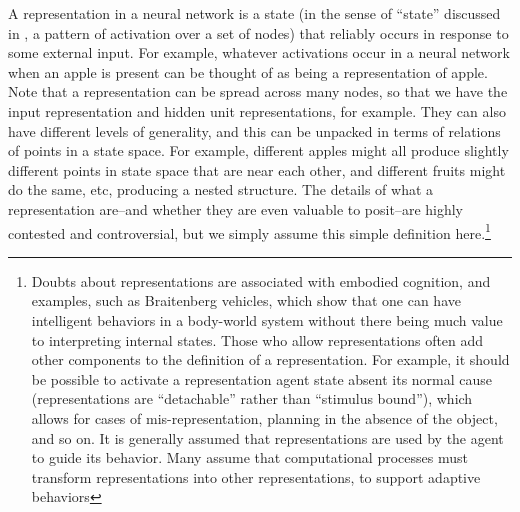 
A representation in a neural network is a state (in the sense of ``state'' discussed in ,  a pattern of activation over a set of nodes) that reliably occurs in response to some external input. For example, whatever activations occur in a neural network when an apple is present can be thought of as being a representation of apple. Note that a representation can be spread across many nodes, so that we have the input representation and hidden unit representations, for example. They can also have different levels of generality, and this can be unpacked in terms of relations of points in a state space. For example, different apples might all produce slightly different points in state space that are near each other, and different fruits might do the same, etc, producing a nested structure. The details of what a representation are--and whether they are even valuable to posit--are highly contested and controversial, but we simply assume this simple definition here.\footnote{Doubts about representations are associated with embodied cognition, and examples, such as Braitenberg vehicles, which show that one can have intelligent behaviors in a body-world system without there being much value to interpreting internal states. Those who allow representations  often add other components to the definition of a representation. For example, it should be  possible to activate a representation agent state absent its normal cause (representations  are ``detachable'' rather than ``stimulus bound''), which allows for cases of  mis-representation, planning in the absence of the object, and so on. It is generally assumed that  representations are used by the agent to guide its behavior. Many assume that computational processes must transform representations  into other representations, to support adaptive behaviors}

